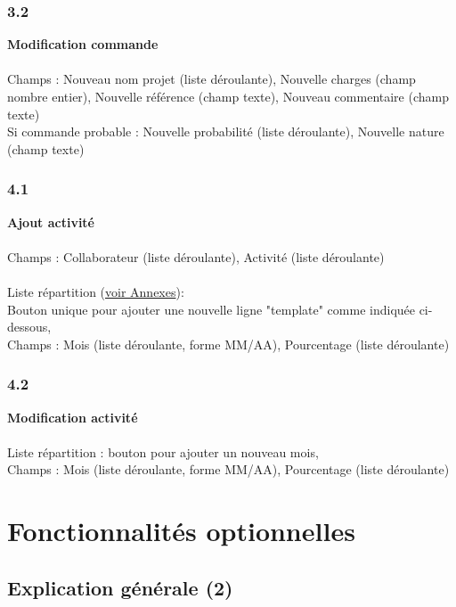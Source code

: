\documentclass[french]{report}
\begin{document}
\subsubsection{3.2}
\label{sec:3.2}
\textbf{Modification commande}\\\\ Champs : Nouveau nom projet (liste déroulante), Nouvelle
charges (champ nombre entier), Nouvelle référence (champ texte), Nouveau commentaire
(champ texte)\\
Si commande probable : Nouvelle probabilité (liste déroulante), Nouvelle nature (champ texte)

\newpage

\subsubsection{4.1}
\label{sec:4.1}
\textbf{Ajout activité}\\\\
Champs : Collaborateur (liste déroulante), Activité (liste déroulante)\\\\
Liste répartition (\hyperref[sec:annexe]{voir Annexes}):\\
Bouton unique pour ajouter une nouvelle ligne "template" comme indiquée ci-dessous,\\
Champs : Mois (liste déroulante, forme MM/AA), Pourcentage (liste déroulante)


\subsubsection{4.2}
\label{sec:4.2}
\textbf{Modification activité}\\\\
Liste répartition : bouton pour ajouter un nouveau mois,\\
Champs : Mois (liste déroulante, forme MM/AA), Pourcentage (liste déroulante)


  \section{Fonctionnalités optionnelles}
\subsection{Explication générale (2)}
\end{document}
